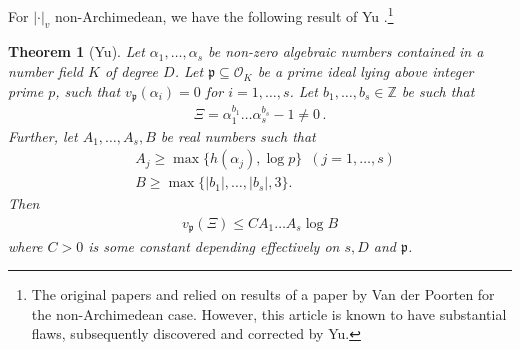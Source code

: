 \documentclass{article}\usepackage[a4paper,margin=20mm]{geometry}
\newtheorem{theorem}{Theorem}\newtheorem{lemma}[theorem]{Lemma}\newtheorem{proposition}[theorem]{Proposition}\newtheorem{corollary}[theorem]{Corollary}\newtheorem{definition}[theorem]{Definition}\newtheorem{claim}[theorem]{Claim}\newtheorem{remark}[theorem]{Remark}\newtheorem{observation}[theorem]{Observation}\newtheorem{conjecture}[theorem]{Conjecture}\newtheorem{example}[theorem]{Example}
\newcommand{\p}{\mathfrak{p}}
\newcommand{\Z}{\mathbb{Z}}
\renewcommand{\O}{\mathcal{O}}
\begin{document}
For $|\cdot|_v$ non-Archimedean, we have the following result of Yu \cite[Theorem 1]{yu_p-adic_1999}.\footnote{The original papers \cite{Vereshchagin} and \cite{Mignotte_distance} relied on results of a paper \cite{Van_der_Poorten_1977} by Van der Poorten for the non-Archimedean case. However, this article is known to have substantial flaws, subsequently discovered and corrected by Yu.}
\begin{theorem}[Yu]\label{Yu}
Let $\alpha_1, \dots , \alpha_s$ be non-zero algebraic numbers contained in a number field $K$ of degree $D$. Let $\p \subseteq \O_K$ be a prime ideal lying above integer prime $p$, such that $v_\p(\alpha_i) = 0$ for $i = 1, \dots, s$. Let $b_1,\dots,b_s \in \Z$ be such that
\begin{align*}
    \Xi = \alpha_1^{b_1} \dots \alpha_s^{b_s}-1 \neq 0 \, .
\end{align*}
Further, let $A_1, \dots , A_s, B$ be real numbers such that
\begin{align*}
    &A_j \geq \max\{h(\alpha_j), \log p\} \, \, \, (j=1 , \dots , s) \\
    &B \geq \max \{|b_1| , \dots , |b_s|, 3\}.
\end{align*}
Then
\begin{align*}
    v_\p(\Xi) \leq CA_1 \dots A_s \log B
\end{align*}
where $C>0$ is some constant depending effectively on $s, D$ and  $\p$.
\end{theorem}
\end{document}
